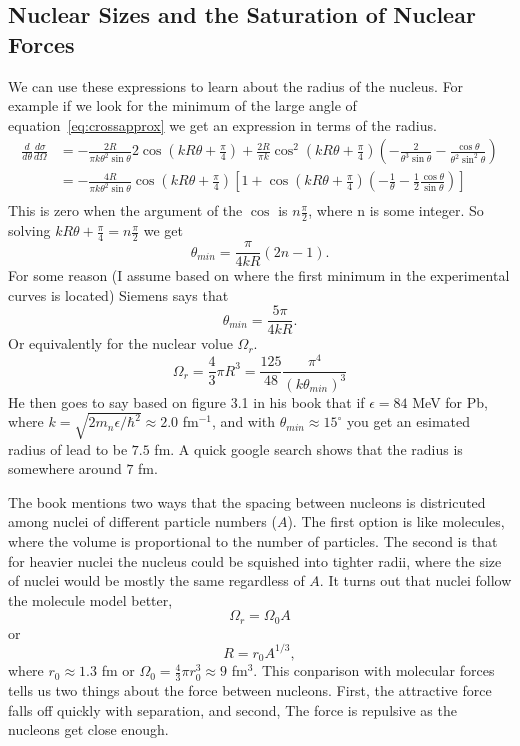 \documentclass[12pt]{extarticle}
\begin{document}
\subsection{Nuclear Sizes and the Saturation of Nuclear Forces}
We can use these expressions to learn about the radius of the nucleus. For example if we look for the minimum of the large angle of equation~\ref{eq:crossapprox} we get an expression in terms of the radius.
\begin{align}
   \frac{d}{d\theta}\frac{d\sigma}{d\Omega} &= -\frac{2R}{\pi k\theta^2\sin\theta}2\cos\left(kR\theta+\frac{\pi}{4}\right) + \frac{2R}{\pi k}\cos^2\left(kR\theta+\frac{\pi}{4}\right)\left(-\frac{2}{\theta^3\sin\theta}-\frac{\cos\theta}{\theta^2\sin^2\theta}\right) \\
   &= -\frac{4R}{\pi k\theta^2\sin\theta}\cos\left(kR\theta+\frac{\pi}{4}\right) \left[1 + \cos\left(kR\theta+\frac{\pi}{4}\right)\left(-\frac{1}{\theta}-\frac{1}{2}\frac{\cos\theta}{\sin\theta}\right)\right] \\
\end{align}
This is zero when the argument of the $\cos$ is $n\frac{\pi}{2}$, where n is some integer. So solving $kR\theta+\frac{\pi}{4} = n\frac{\pi}{2}$ we get
\begin{equation}
   \theta_{min} = \frac{\pi}{4kR}(2n-1).
\end{equation}
For some reason (I assume based on where the first minimum in the experimental curves is located) Siemens says that
\begin{equation}
   \boxed{ \theta_{min} = \frac{5\pi}{4kR} }.
\end{equation}
Or equivalently for the nuclear volue $\Omega_r$.
\begin{equation}
   \Omega_r = \frac{4}{3}\pi R^3 = \frac{125}{48}\frac{\pi^4}{(k\theta_{min})^3}
\end{equation}
He then goes to say based on figure 3.1 in his book that if $\epsilon = 84$ MeV for Pb, where $k = \sqrt{2m_n\epsilon/\hbar^2} \approx 2.0$ fm$^{-1}$, and with $\theta_{min} \approx 15^\circ$ you get an esimated radius of lead to be $7.5$ fm. A quick google search shows that the radius is somewhere around $7$ fm.

The book mentions two ways that the spacing between nucleons is districuted among nuclei of different particle numbers ($A$). The first option is like molecules, where the volume is proportional to the number of particles. The second is that for heavier nuclei the nucleus could be squished into tighter radii, where the size of nuclei would be mostly the same regardless of $A$. It turns out that nuclei follow the molecule model better,
\begin{equation}
   \Omega_r = \Omega_0 A
\end{equation}
or
\begin{equation}
   R = r_0 A^{1/3},
\end{equation}
where $r_0 \approx 1.3$ fm or $\Omega_0 = \frac{4}{3} \pi r_0^3 \approx 9$ fm$^3$.
This conparison with molecular forces tells us two things about the force between nucleons. First, the attractive force falls off quickly with separation, and second, The force is repulsive as the nucleons get close enough.
\end{document}
